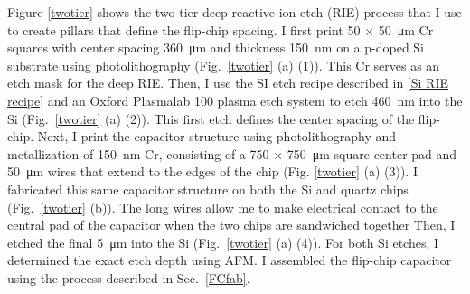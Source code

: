 \documentclass[double,12pt,1in,seploa]{beavtex}
\begin{document}
Figure \ref{twotier} shows the two-tier deep reactive ion etch (RIE) process that I use to create pillars that define the flip-chip spacing. I first print 50 $\times$ \SI{50}{\micro\meter} Cr squares with center spacing \SI{360}{\micro\meter} and thickness \SI{150}{\nano\meter} on a p-doped Si substrate using photolithography (Fig.\ \ref{twotier} (a) (1)). This Cr serves as an etch mask for the deep RIE. Then, I use the SI etch recipe described in \ref{Si RIE recipe} and an Oxford Plasmalab 100 plasma etch system to etch \SI{460}{\nano\meter} into the Si (Fig.\ \ref{twotier} (a) (2)). This first etch defines the center spacing of the flip-chip. Next, I print the capacitor structure using photolithography and metallization of \SI{150}{\nano\meter} Cr, consisting of a 750 $\times$ \SI{750}{\micro\meter} square center pad and \SI{50}{\micro\meter} wires that extend to the edges of the chip (Fig. \ref{twotier} (a) (3)). I fabricated this same capacitor structure on both the Si and quartz chips (Fig.\ \ref{twotier} (b)). The long wires allow me to make electrical contact to the central pad of the capacitor when the two chips are sandwiched together Then, I etched the final \SI{5}{\micro\meter} into the Si (Fig.\ \ref{twotier} (a) (4)). For both Si etches, I determined the exact etch depth using AFM. I assembled the flip-chip capacitor using the process described in Sec.\ \ref{FCfab}. 
 

\end{document}
